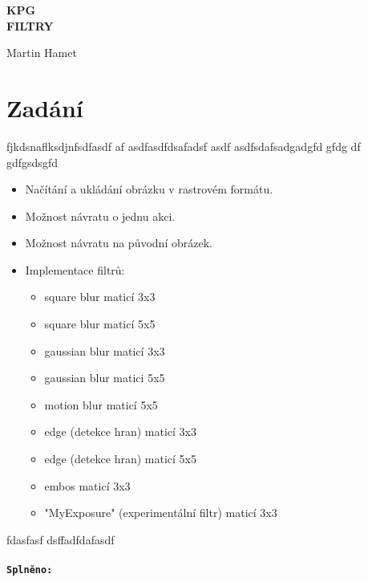 \documentclass[12pt]{article}
\begin{document}
\begin{titlepage}
\begin{center}
\vspace{5cm}
{\Huge
\textbf{KPG}\\
\vspace{1cm}
}
{\Large
\textbf{FILTRY}
}
\end{center}
\vspace{\fill}

\begin{minipage}[t]{5cm}
\flushleft
Martin Hamet
\end{minipage}
\hfill
\begin{minipage}[t]{7cm}
\flushright
\end{minipage}
\end{titlepage}

\tableofcontents
\newpage

\section{Zadání}
fjkdsnaflksdjnfsdfasdf af asdfasdfdsafadsf asdf
asdfsdafsadgadgfd gfdg
df gdfgsdsgfd

\begin{itemize}
\item Načítání a ukládání obrázku v rastrovém formátu.
\item Možnost návratu o jednu akci.
\item Možnost návratu na původní obrázek.
\item Implementace filtrů:
\begin{itemize}
\item square blur maticí 3x3
\item square blur maticí 5x5
\item gaussian blur maticí 3x3
\item gaussian blur matici 5x5
\item motion blur maticí 5x5
\item edge (detekce hran) maticí 3x3
\item edge (detekce hran) maticí 5x5
\item embos maticí 3x3
\item "MyExposure" (experimentální filtr) maticí 3x3
\end{itemize}

\end{itemize}
fdasfasf
dsffadfdafasdf

\paragraph{\texttt{Splněno:}}
\end{document}
